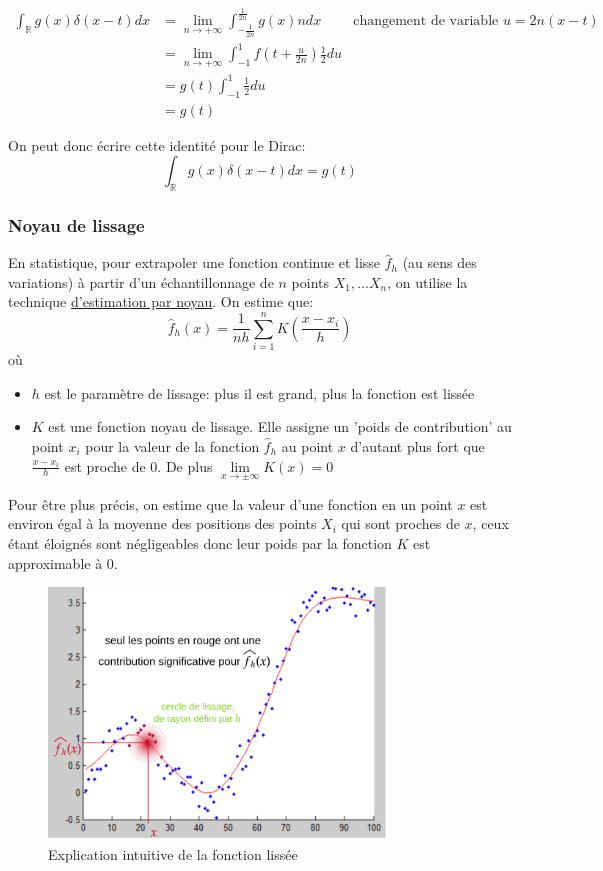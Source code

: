 \documentclass[a4paper,10pt]{report}
\begin{document}
\begin{align*}
 \int_\mathbb{R} g(x)\delta(x-t)dx &= \lim_{n \to +\infty} \int_{-\frac{1}{2n}}^{\frac{1}{2n}} g(x) n dx & \text{changement de variable } u=2n(x-t) \\
 &= \lim_{n \to + \infty} \int_{-1}^1 f(t + \frac{u}{2n})\frac{1}{2}du \\
 &= g(t)\int_{-1}^1 \frac{1}{2}du \\
 &= g(t)
\end{align*}

On peut donc écrire cette identité pour le Dirac:
$$\boxed{ \int_\mathbb{R} g(x)\delta(x-t)dx = g(t)}$$
\newpage
\subsubsection{Noyau de lissage}
En statistique, pour extrapoler une fonction continue et lisse $\hat{f}_h$ (au sens des variations) à partir d'un échantillonnage de $n$ points $X_1, ... X_n$, on utilise la technique \href{https://fr.wikipedia.org/wiki/Estimation_par_noyau}{d'estimation par noyau}. On estime que:
$$\hat{f}_h(x) = \frac{1}{nh} \sum_{i=1}^n K(\frac{x - x_i}{h})$$
où
\begin{itemize}
 \item $h$ est le paramètre de lissage: plus il est grand, plus la fonction est lissée
 \item $K$ est une fonction noyau de lissage. Elle assigne un 'poids de contribution' au point $x_i$ pour la valeur de la fonction $\hat{f}_h$ au point $x$ d'autant plus fort que $\frac{x - x_i}{h}$ est proche de 0. De plus $\underset{x\to \pm \infty}{\lim} K(x) = 0$
\end{itemize}

Pour être plus précis, on estime que la valeur d'une fonction en un point $x$ est environ égal à la moyenne des positions des points $X_i$ qui sont proches de $x$, ceux étant éloignés sont négligeables donc leur poids par la fonction $K$ est approximable à 0.
\begin{figure}[h]
\begin{center}
 \includegraphics[width=0.8\textwidth]{kernel_smoother_graph}
\end{center}
 \caption{Explication intuitive de la fonction lissée}
\end{figure}
\end{document}
